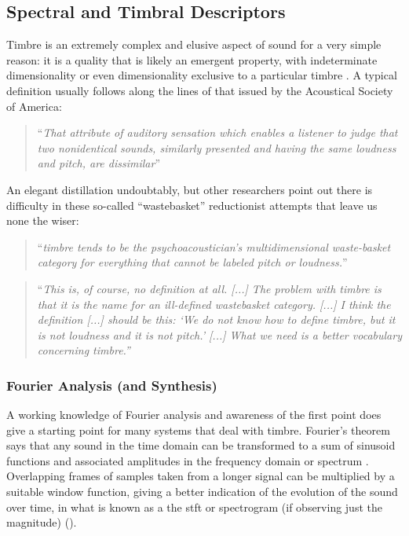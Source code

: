 {{\subsection{Spectral and Timbral Descriptors}

Timbre is an extremely complex and elusive aspect of sound for a very simple reason: it is a quality that is likely an emergent property, with indeterminate dimensionality \citep{Elliott2013, Siedenburg2017} or even dimensionality exclusive to a particular timbre \citep{Krumhansl1989}. A typical definition usually follows along the lines of that issued by the Acoustical Society of America:

\blockcquote[]{ansi}{``\textit{That attribute of auditory sensation which enables a listener to judge that two nonidentical sounds, similarly presented and having the same loudness and pitch, are dissimilar}''} 

An elegant distillation undoubtably, but other researchers point out \citep{Siedenburg2017} there is difficulty in these so-called ``wastebasket'' reductionist attempts that leave us none the wiser:

\blockcquote[]{McAdams1979}{``\textit{timbre tends to be the psychoacoustician's multidimensional waste-basket category for everything that cannot be labeled pitch or loudness.}''} 

\blockcquote[]{Bregman1994}{``\textit{This is, of course, no definition at all. [...] The problem with timbre is that it is the name for an ill-defined wastebasket category. [...] I think the definition [...] should be this: ‘We do not know how to define timbre, but it is not loudness and it is not pitch.’ [...] What we need is a better vocabulary concerning timbre.''}}

\subsubsection{Fourier Analysis (and Synthesis)}

A working knowledge of Fourier analysis and awareness of the first point \citep{ansi} does give a starting point for many systems that deal with timbre. Fourier's theorem says that any sound in the time domain can be transformed to a sum of sinusoid functions and associated amplitudes in the frequency domain or spectrum \citep{Roads1996}. Overlapping frames of samples taken from a longer signal can be multiplied by a suitable window function, giving a better indication of the evolution of the sound over time, in what is known as a the \acrshort{stft} or spectrogram (if observing just the magnitude) \citep{Collins2010}().

}}
